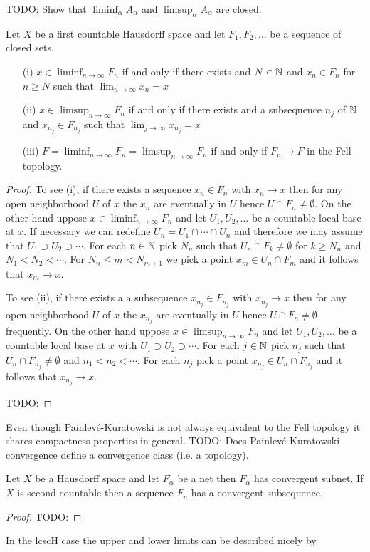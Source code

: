 TODO: Show that $\liminf_\alpha A_\alpha$ and $\limsup_\alpha A_\alpha$ are closed.

\begin{prop}\label{PainleveKuratowskiFirstCountable}Let $X$ be a first countable Hausdorff space and let $F_1, F_2, \dotsc$ be a sequence of closed sets.
\begin{itemize}
\item[(i)] $x \in \liminf_{n \to \infty} F_n$ if and only if there exists and $N \in \mathbb{N}$ and $x_n \in F_n$ for $n \geq N$ such that $\lim_{n \to \infty} x_n = x$
\item[(ii)] $x \in \limsup_{n \to \infty} F_n$ if and only if there exists and a subsequence $n_j$ of $\mathbb{N}$ and $x_{n_j} \in F_{n_j}$ such that $\lim_{j \to \infty} x_{n_j} = x$
\item[(iii)] $F = \liminf_{n \to \infty} F_n = \limsup_{n \to \infty} F_n$ if and only if $F_n \to F$ in the Fell topology.
\end{itemize}
\end{prop}
\begin{proof}
To see (i), if there exists a sequence $x_n \in F_n$ with $x_n \to x$ then for any open neighborhood $U$ of $x$ the $x_n$ are eventually in $U$ hence $U \cap F_n \neq \emptyset$.  On the other hand uppose $x \in \liminf_{n \to \infty} F_n$  and let $U_1, U_2, \dotsc$ be a countable local base at $x$.  If necessary we can redefine $U_n = U_1 \cap \dotsb \cap U_n$ and therefore we may assume that $U_1 \supset U_2 \supset \dotsb$.  For each $n \in \mathbb{N}$ pick $N_n$ such that $U_n \cap F_k \neq \emptyset$ for $k \geq N_n$ and $N_1 < N_2 < \dotsb$.  For $N_n \leq m < N_{m+1}$ we pick a 
point $x_m \in U_n \cap F_m$ and it follows that $x_m \to x$.

To see (ii), if there exists a a subsequence $x_{n_j} \in F_{n_j}$ with $x_{n_j} \to x$ then for any open neighborhood $U$ of $x$ the $x_{n_j}$ are eventually in $U$ hence $U \cap F_n \neq \emptyset$ frequently.  On the other hand uppose $x \in \limsup_{n \to \infty} F_n$  and let $U_1, U_2, \dotsc$ be a countable local base at $x$ with $U_1 \supset U_2 \supset \dotsb$.  For each $j \in \mathbb{N}$ pick $n_j$ such that $U_n \cap F_{n_j} \neq \emptyset$ and $n_1 < n_2 < \dotsb$.  For each $n_j$ pick a 
point $x_{n_j} \in U_n \cap F_{n_j}$ and it follows that $x_{n_j} \to x$.

TODO:
\end{proof}

Even though Painlev\'{e}-Kuratowski is not always equivalent to the Fell topology it shares compactness properties in general.  TODO: Does Painlev\'{e}-Kuratowski convergence define a convergence class (i.e. a topology).
\begin{prop}Let $X$ be a Hausdorff space and let $F_\alpha$ be a net then $F_\alpha$ has convergent subnet.  If $X$ is second countable then a sequence $F_n$ has a convergent subsequence.
\end{prop}
\begin{proof}
TODO:
\end{proof}

In the lcscH case the upper and lower limits can be described nicely by 

